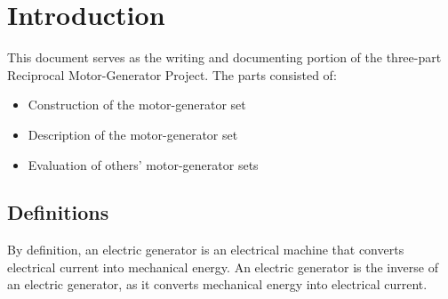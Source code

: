 \newpage
\section{Introduction}
This document serves as the writing and documenting portion of the three-part Reciprocal Motor-Generator Project. The parts consisted of:

    \begin{itemize}

        \item Construction of the motor-generator set

        \item Description of the motor-generator set

        \item Evaluation of others' motor-generator sets

    \end{itemize}

    \subsection{Definitions}
    By definition, an electric generator is an electrical machine that converts electrical current into mechanical energy. An electric generator is the inverse of an electric generator, as it converts mechanical energy into electrical current.
